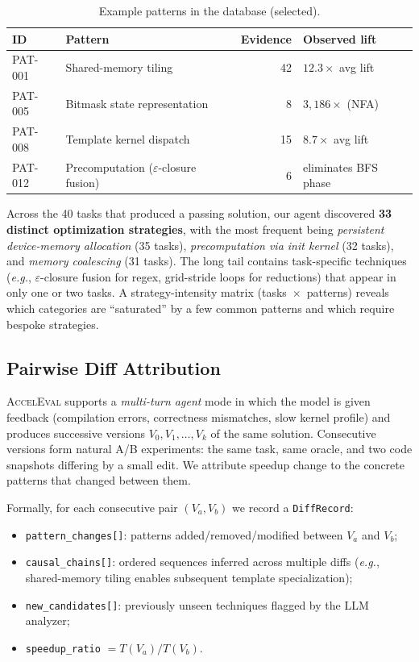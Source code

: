 \documentclass{article}
\begin{document}
\begin{table}[ht]
\centering
\small
\caption{Example patterns in the database (selected).}
\label{tab:patterns}
\begin{tabular}{@{}llrl@{}}
\toprule
\textbf{ID} & \textbf{Pattern} & \textbf{Evidence} & \textbf{Observed lift} \\
\midrule
PAT-001 & Shared-memory tiling                & 42 & $12.3\times$ avg lift \\
PAT-005 & Bitmask state representation        & 8  & $3{,}186\times$ (NFA) \\
PAT-008 & Template kernel dispatch            & 15 & $8.7\times$ avg lift \\
PAT-012 & Precomputation ($\varepsilon$-closure fusion) & 6  & eliminates BFS phase \\
\bottomrule
\end{tabular}
\end{table}

Across the 40 tasks that produced a passing solution, our agent discovered \textbf{33 distinct optimization strategies}, with the most frequent being \emph{persistent device-memory allocation} (35 tasks), \emph{precomputation via init kernel} (32 tasks), and \emph{memory coalescing} (31 tasks). The long tail contains task-specific techniques (\emph{e.g.}, $\varepsilon$-closure fusion for regex, grid-stride loops for reductions) that appear in only one or two tasks. A strategy-intensity matrix (tasks~$\times$~patterns) reveals which categories are ``saturated'' by a few common patterns and which require bespoke strategies.

\subsection{Pairwise Diff Attribution}
\label{sec:pairwise}

\textsc{AccelEval} supports a \emph{multi-turn agent} mode in which the model is given feedback (compilation errors, correctness mismatches, slow kernel profile) and produces successive versions $V_0, V_1, \ldots, V_k$ of the same solution. Consecutive versions form natural A/B experiments: the same task, same oracle, and two code snapshots differing by a small edit. We attribute speedup change to the concrete patterns that changed between them.

Formally, for each consecutive pair $(V_a, V_b)$ we record a \texttt{DiffRecord}:
\begin{itemize}
  \item \texttt{pattern\_changes[]}: patterns added/removed/modified between $V_a$ and $V_b$;
  \item \texttt{causal\_chains[]}: ordered sequences inferred across multiple diffs (\emph{e.g.}, shared-memory tiling enables subsequent template specialization);
  \item \texttt{new\_candidates[]}: previously unseen techniques flagged by the LLM analyzer;
  \item \texttt{speedup\_ratio} $= T(V_a) / T(V_b)$.
\end{itemize}
\end{document}
